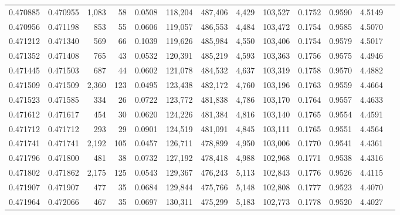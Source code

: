 \begin{tabular}{rrrrrrrrrrrrr}
0.470885 & 0.470955 & 1,083 &    58 &                                     0.0508 & 118,204 & 487,406 &   4,429 & 103,527 & 0.1752 & 0.9590 & 4.5149 \\
0.470956 & 0.471198 &   853 &    55 &                                     0.0606 & 119,057 & 486,553 &   4,484 & 103,472 & 0.1754 & 0.9585 & 4.5070 \\
0.471212 & 0.471340 &   569 &    66 &                                     0.1039 & 119,626 & 485,984 &   4,550 & 103,406 & 0.1754 & 0.9579 & 4.5017 \\
0.471352 & 0.471408 &   765 &    43 &                                     0.0532 & 120,391 & 485,219 &   4,593 & 103,363 & 0.1756 & 0.9575 & 4.4946 \\
0.471445 & 0.471503 &   687 &    44 &                                     0.0602 & 121,078 & 484,532 &   4,637 & 103,319 & 0.1758 & 0.9570 & 4.4882 \\
0.471509 & 0.471509 & 2,360 &   123 &                                     0.0495 & 123,438 & 482,172 &   4,760 & 103,196 & 0.1763 & 0.9559 & 4.4664 \\
0.471523 & 0.471585 &   334 &    26 &                                     0.0722 & 123,772 & 481,838 &   4,786 & 103,170 & 0.1764 & 0.9557 & 4.4633 \\
0.471612 & 0.471617 &   454 &    30 &                                     0.0620 & 124,226 & 481,384 &   4,816 & 103,140 & 0.1765 & 0.9554 & 4.4591 \\
0.471712 & 0.471712 &   293 &    29 &                                     0.0901 & 124,519 & 481,091 &   4,845 & 103,111 & 0.1765 & 0.9551 & 4.4564 \\
0.471741 & 0.471741 & 2,192 &   105 &                                     0.0457 & 126,711 & 478,899 &   4,950 & 103,006 & 0.1770 & 0.9541 & 4.4361 \\
0.471796 & 0.471800 &   481 &    38 &                                     0.0732 & 127,192 & 478,418 &   4,988 & 102,968 & 0.1771 & 0.9538 & 4.4316 \\
0.471802 & 0.471862 & 2,175 &   125 &                                     0.0543 & 129,367 & 476,243 &   5,113 & 102,843 & 0.1776 & 0.9526 & 4.4115 \\
0.471907 & 0.471907 &   477 &    35 &                                     0.0684 & 129,844 & 475,766 &   5,148 & 102,808 & 0.1777 & 0.9523 & 4.4070 \\
0.471964 & 0.472066 &   467 &    35 &                                     0.0697 & 130,311 & 475,299 &   5,183 & 102,773 & 0.1778 & 0.9520 & 4.4027 \\

\end{tabular}
